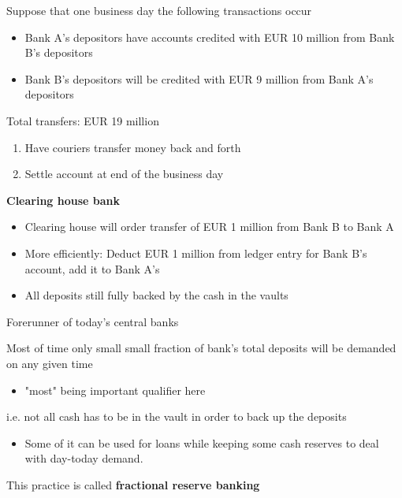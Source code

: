 \documentclass{beamer}
\begin{document}
\begin{frame}
  Suppose that one business day the following transactions occur
\begin{itemize}
  \item Bank A's depositors have accounts credited with EUR 10 million from Bank B's depositors
  \item Bank B's depositors will be credited with EUR 9 million from Bank A's depositors
\end{itemize}
 \medskip
 Total transfers: EUR 19 million\\
 \begin{enumerate}
   \item Have couriers transfer money back and forth
   \item Settle account at end of the business day
 \end{enumerate}
\end{frame}

\begin{frame}
  \textbf{Clearing house bank}
  \begin{itemize}
  \item Clearing house will order transfer of EUR 1 million from Bank B to Bank A
  \item More efficiently: Deduct EUR 1 million from ledger entry for Bank B's account,  add it to Bank A's
  \item All deposits still fully backed by the cash in the vaults
\end{itemize}
\medskip
Forerunner of today's central banks
\end{frame}

\begin{frame}
 Most of time only small small fraction of bank's total deposits will be demanded on any given time
 \begin{itemize}
   \item "most" being important qualifier here
 \end{itemize}
 i.e. not all cash has to be in the vault in order to back up the deposits
 \begin{itemize}
   \item Some of it can be used for loans while keeping some cash reserves to deal with day-today demand. 
 \end{itemize}
This practice is called \textbf{fractional reserve banking }
\end{frame}
\end{document}
